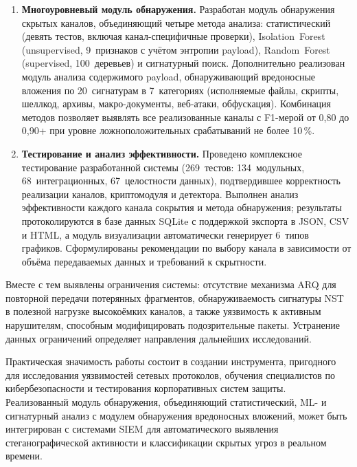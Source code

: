 \begin{enumerate}[label=\arabic*)]
    \item \textbf{Многоуровневый модуль обнаружения.} Разработан модуль обнаружения скрытых каналов, объединяющий четыре метода анализа: статистический (девять тестов, включая канал-специфичные проверки), Isolation~Forest (unsupervised, 9~признаков с учётом энтропии payload), Random~Forest (supervised, 100~деревьев) и сигнатурный поиск. Дополнительно реализован модуль анализа содержимого payload, обнаруживающий вредоносные вложения по 20~сигнатурам в 7~категориях (исполняемые файлы, скрипты, шеллкод, архивы, макро-документы, веб-атаки, обфускация). Комбинация методов позволяет выявлять все реализованные каналы с F1-мерой от 0{,}80 до 0{,}90+ при уровне ложноположительных срабатываний не более 10\,\%.

    \item \textbf{Тестирование и анализ эффективности.} Проведено комплексное тестирование разработанной системы (269~тестов: 134~модульных, 68~интеграционных, 67~целостности данных), подтвердившее корректность реализации каналов, криптомодуля и детектора. Выполнен анализ эффективности каждого канала сокрытия и метода обнаружения; результаты протоколируются в базе данных SQLite с поддержкой экспорта в JSON, CSV и HTML, а модуль визуализации автоматически генерирует 6~типов графиков. Сформулированы рекомендации по выбору канала в зависимости от объёма передаваемых данных и требований к скрытности.
\end{enumerate}

Вместе с тем выявлены ограничения системы: отсутствие механизма ARQ для повторной передачи потерянных фрагментов, обнаруживаемость сигнатуры NST в полезной нагрузке высокоёмких каналов, а также уязвимость к активным нарушителям, способным модифицировать подозрительные пакеты. Устранение данных ограничений определяет направления дальнейших исследований.

Практическая значимость работы состоит в создании инструмента, пригодного для исследования уязвимостей сетевых протоколов, обучения специалистов по кибербезопасности и тестирования корпоративных систем защиты. Реализованный модуль обнаружения, объединяющий статистический, ML- и сигнатурный анализ с модулем обнаружения вредоносных вложений, может быть интегрирован с системами SIEM для автоматического выявления стеганографической активности и классификации скрытых угроз в реальном времени.


